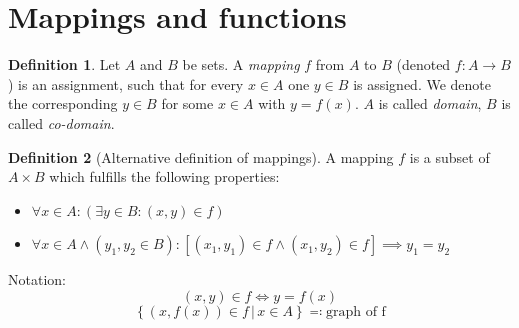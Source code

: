 \documentclass[a4paper,landscape,twocolumn]{article}
\theoremstyle{definition}
\newtheorem{defi}{Definition}
\newcommand\setdef[2]{\left\{#1\,|\,#2\right\}}
\begin{document}
\section{Mappings and functions}
\begin{defi}
  Let $A$ and $B$ be sets.
  A \emph{mapping} $f$ from $A$ to $B$ (denoted $f: A \rightarrow B$) is an assignment,
  such that for every $x \in A$ one $y \in B$ is assigned. We denote the corresponding
  $y \in B$ for some $x \in A$ with $y = f(x)$.
  $A$ is called \emph{domain}, $B$ is called \emph{co-domain}.
\end{defi}

\begin{defi}[Alternative definition of mappings]
  A mapping $f$ is a subset of $A \times B$ which fulfills the following properties:
  \begin{itemize}
    \item $\forall x \in A: \left(\exists y \in B: (x, y) \in f\right)$
    \item $\forall x \in A \land (y_1, y_2 \in B): \left[(x_1,y_1) \in f \land (x_1, y_2) \in f\right] \implies y_1 = y_2$
  \end{itemize}
  Notation:
  \[ (x, y) \in f \Leftrightarrow y = f(x) \]
  \[ \setdef{(x, f(x)) \in f}{x \in A} \eqqcolon \text{graph of f} \]
\end{defi}
\end{document}
